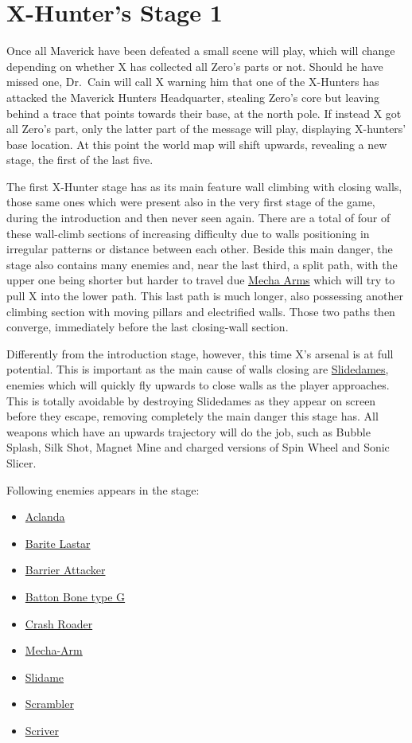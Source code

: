 \section{X-Hunter's Stage 1}
Once all Maverick have been defeated a small scene will play, which will change depending on whether X has collected all Zero's parts or not. Should he have missed one, Dr.~Cain will call X warning him that one of the X-Hunters has attacked the Maverick Hunters Headquarter, stealing Zero's core but leaving behind a trace that points towards their base, at the north pole. If instead X got all Zero's part, only the latter part of the message will play, displaying X-hunters' base location. At this point the world map will shift upwards, revealing a new stage, the first of the last five.

The first X-Hunter stage has as its main feature wall climbing with closing walls, those same ones which were present also in the very first stage of the game, during the introduction and then never seen again. There are a total of four of these wall-climb sections of increasing difficulty due to walls positioning in irregular patterns or distance between each other. Beside this main danger, the stage also contains many enemies and, near the last third, a split path, with the upper one being shorter but harder to travel due \hyperlink{enem:Mecha-Arm}{Mecha Arms} which will try to pull X into the lower path. This last path is much longer, also possessing another climbing section with moving pillars and electrified walls. Those two paths then converge, immediately before the last closing-wall section.

Differently from the introduction stage, however, this time X's arsenal is at full potential. This is important as the main cause of walls closing are \hyperlink{enem:Slidame}{Slidedames}, enemies which will quickly fly upwards to close walls as the player approaches. This is totally avoidable by destroying Slidedames as they appear on screen before they escape, removing completely the main danger this stage has. All weapons which have an upwards trajectory will do the job, such as Bubble Splash, Silk Shot, Magnet Mine and charged versions of Spin Wheel and Sonic Slicer.

Following enemies appears in the stage:
\begin{itemize}
	\item \hyperlink{enem:Aclanda}{Aclanda}
	\item \hyperlink{enem:Barite_Lastar}{Barite Lastar}
	\item \hyperlink{enem:Barrier_Attacker}{Barrier Attacker}
	\item \hyperlink{enem:Batton_Bone_type_G}{Batton Bone type G}
	\item \hyperlink{enem:Crash_Roader}{Crash Roader}
	\item \hyperlink{enem:Mecha-Arm}{Mecha-Arm}
	\item \hyperlink{enem:Slidame}{Slidame}
	\item \hyperlink{enem:Scrambler}{Scrambler}
	\item \hyperlink{enem:Scriver}{Scriver}
\end{itemize}

